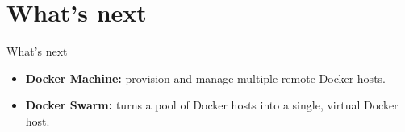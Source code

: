 \documentclass[10pt]{beamer}
\begin{document}
\section{What's next}
\begin{frame}{What's next}
	\begin{itemize}
		\item \textbf{Docker Machine:} provision and manage multiple remote Docker hosts.
		\item \textbf{Docker Swarm:}  turns a pool of Docker hosts into a single, virtual Docker host.
	\end{itemize}
\end{frame}
	
{\1
\begin{frame}
\end{frame}}
\end{document}
